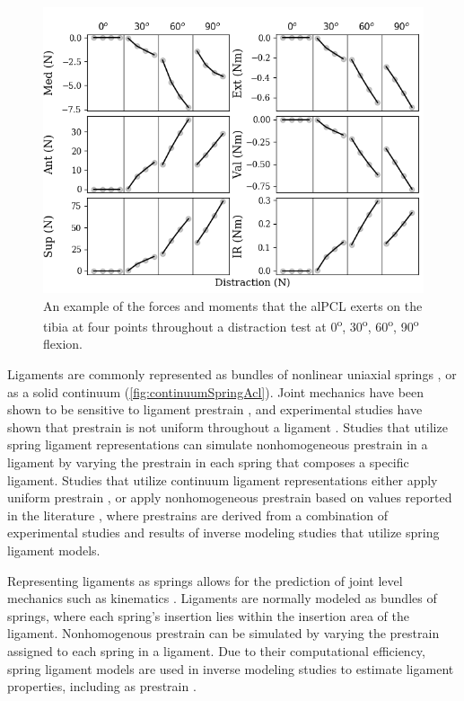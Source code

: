 \begin{figure}
    \centering
    \includegraphics[width=0.75\linewidth]{../img/Spec1_Distraction_alPCL_Forces.png}
    \caption{An example of the forces and moments that the alPCL exerts on the tibia at four points throughout a distraction test at 0\textsuperscript{o}, 30\textsuperscript{o}, 60\textsuperscript{o}, 90\textsuperscript{o} flexion.}
    \label{fig:alPclForce}
\end{figure}

Ligaments are commonly represented as bundles of nonlinear uniaxial springs \citep{blankevoort_validation_1996,baldwin_efficient_2009,ewing_estimating_2015}, or as a solid continuum \citep{gardiner_subject-specific_2003,pena_three-dimensional_2006,dhaher_effect_2010} (\autoref{fig:continuumSpringAcl}). Joint mechanics have been shown to be sensitive to ligament prestrain \citep{baldwin_efficient_2009}, and experimental studies have shown that prestrain is not uniform throughout a ligament \citep{hull_strain_1996,gardiner_strain_2001}. Studies that utilize spring ligament representations can simulate nonhomogeneous prestrain in a ligament by varying the prestrain in each spring that composes a specific ligament. Studies that utilize continuum ligament representations either apply uniform prestrain \citep{limbert_three-dimensional_2004,song_three-dimensional_2004,beidokhti_influence_2017}, or apply nonhomogeneous prestrain based on values reported in the literature \citep{pena_three-dimensional_2006,dhaher_effect_2010}, where prestrains are derived from a combination of experimental studies and results of inverse modeling studies that utilize spring ligament models.

Representing ligaments as springs allows for the prediction of joint level mechanics such as kinematics \citep{weiss_computational_2001}. Ligaments are normally modeled as bundles of springs, where each spring's insertion lies within the insertion area of the ligament. Nonhomogenous prestrain can be simulated by varying the prestrain assigned to each spring in a ligament. Due to their computational efficiency, spring ligament models are used in inverse modeling studies to estimate ligament properties, including as prestrain \citep{blankevoort_validation_1996,baldwin_dynamic_2012,ewing_estimating_2015,harris_combined_2016}.

